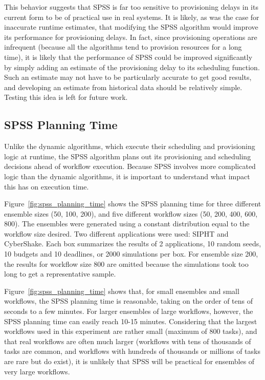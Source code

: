 \documentclass[conference]{IEEEtran}
\begin{document}
This behavior suggests that SPSS is far too sensitive to provisioning delays in its current form to be of practical use in real systems. It is likely, as was the case for inaccurate runtime estimates, that modifying the SPSS algorithm would improve its performance for provisioning delays. In fact, since provisioning operations are infrequent (because all the algorithms tend to provision resources for a long time), it is likely that the performance of SPSS could be improved significantly by simply adding an estimate of the provisioning delay to its scheduling function. Such an estimate may not have to be particularly accurate to get good results, and developing an estimate from historical data should be relatively simple. Testing this idea is left for future work.


\subsection{SPSS Planning Time}

Unlike the dynamic algorithms, which execute their scheduling and provisioning logic at runtime, the SPSS algorithm plans out its provisioning and scheduling decisions ahead of workflow execution. Because SPSS involves more complicated logic than the dynamic algorithms, it is important to understand what impact this has on execution time.

Figure~\ref{fig:spss_planning_time} shows the SPSS planning time for three different ensemble sizes (50, 100, 200), and five different workflow sizes (50, 200, 400, 600, 800). The ensembles were generated using a constant distribution equal to the workflow size desired. Two different applications were used: SIPHT and CyberShake. Each box summarizes the results of 2 applications, 10 random seeds, 10 budgets and 10 deadlines, or 2000 simulations per box. For ensemble size 200, the results for workflow size 800 are omitted because the simulations took too long to get a representative sample.

Figure~\ref{fig:spss_planning_time} shows that, for small ensembles and small workflows, the SPSS planning time is reasonable, taking on the order of tens of seconds to a few minutes. For larger ensembles of large workflows, however, the SPSS planning time can easily reach 10-15 minutes. Considering that the largest workflows used in this experiment are rather small (maximum of 800 tasks), and that real workflows are often much larger (workflows with tens of thousands of tasks are common, and workflows with hundreds of thousands or millions of tasks are rare but do exist), it is unlikely that SPSS will be practical for ensembles of very large workflows.
\end{document}
